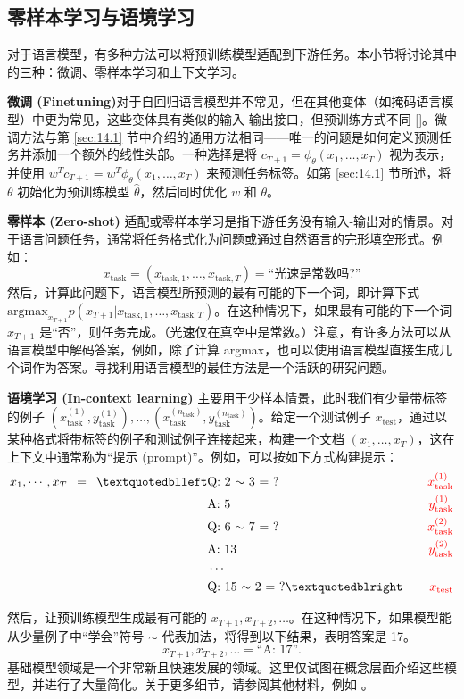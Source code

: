 \subsection{零样本学习与语境学习}\label{sec:14.3.1}

对于语言模型，有多种方法可以将预训练模型适配到下游任务。本小节将讨论其中的三种：微调、零样本学习和上下文学习。

\textbf{微调 (Finetuning)}对于自回归语言模型并不常见，但在其他变体（如掩码语言模型）中更为常见，这些变体具有类似的输入-输出接口，但预训练方式不同 [\cite{devlin2019bert}]。微调方法与第 \ref{sec:14.1} 节中介绍的通用方法相同——唯一的问题是如何定义预测任务并添加一个额外的线性头部。一种选择是将 $c_{T+1} = \phi_\theta(x_1, \dots, x_T)$ 视为表示，并使用 $w^T c_{T+1} = w^T \phi_\theta(x_1, \dots, x_T)$ 来预测任务标签。如第 \ref{sec:14.1} 节所述，将 $\theta$ 初始化为预训练模型 $\hat{\theta}$，然后同时优化 $w$ 和 $\theta$。

\textbf{零样本 (Zero-shot)} 适配或零样本学习是指下游任务没有输入-输出对的情景。对于语言问题任务，通常将任务格式化为问题或通过自然语言的完形填空形式。例如：
\[
    x_{\text{task}} = (x_{\text{task},1}, \dots, x_{\text{task},T}) = \text{“光速是常数吗?”}
\]
然后，计算此问题下，语言模型所预测的最有可能的下一个词，即计算下式 $\text{argmax}_{x_{T+1}} p(x_{T+1} | x_{\text{task},1}, \dots, x_{\text{task},T})$。在这种情况下，如果最有可能的下一个词 $x_{T+1}$ 是“否”，则任务完成。（光速仅在真空中是常数。）注意，有许多方法可以从语言模型中解码答案，例如，除了计算 argmax，也可以使用语言模型直接生成几个词作为答案。寻找利用语言模型的最佳方法是一个活跃的研究问题。

\textbf{语境学习 (In-context learning)} 主要用于少样本情景，此时我们有少量带标签的例子 $(x_{\text{task}}^{(1)}, y_{\text{task}}^{(1)}), \dots, (x_{\text{task}}^{(n_{\text{task}})}, y_{\text{task}}^{(n_{\text{task}})})$。给定一个测试例子 $x_{\text{test}}$，通过以某种格式将带标签的例子和测试例子连接起来，构建一个文档 $(x_1, \dots, x_T)$，这在上下文中通常称为“提示 (prompt)”。例如，可以按如下方式构建提示：
\begin{align*}
    x_1, \cdots, x_T \enspace = \enspace “
        &\text{Q: 2 $\sim$ 3 = ?} \quad & \textcolor{red}{x^{(1)}_\text{task}}\\
        &\text{A: 5} \quad & \textcolor{red}{y^{(1)}_\text{task}}\\
        &\text{Q: 6 $\sim$ 7 = ?} \quad & \textcolor{red}{x^{(2)}_\text{task}}\\
        &\text{A: 13} \quad & \textcolor{red}{y^{(2)}_\text{task}}\\
        &\cdots \\
        &\text{Q: 15 $\sim$ 2 = ?}” \quad & \textcolor{red}{x_{\text{test}}}
\end{align*}

然后，让预训练模型生成最有可能的 $x_{T+1}, x_{T+2}, \dots$。在这种情况下，如果模型能从少量例子中“学会”符号 $\sim$ 代表加法，将得到以下结果，表明答案是 17。
\[
    x_{T+1}, x_{T+2}, \dots = \text{“A: 17”}.
\]
基础模型领域是一个非常新且快速发展的领域。这里仅试图在概念层面介绍这些模型，并进行了大量简化。关于更多细节，请参阅其他材料，例如 \cite{bommasani2021opportunities}。